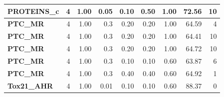 \begin{longtable}{|l||r|r|r|r|r|r||r|r|}
		\textbf{PROTEINS\_c} & 4 & 1.00 & 0.05 & 0.10 & 0.50 & 1.00 & 72.56 & 10 \\ \hline
		\textbf{PTC\_MR} & 4 & 1.00 & 0.3 & 0.20 & 0.20 & 1.00 & 64.59 & 4 \\ \hline
		\textbf{PTC\_MR} & 4 & 1.00 & 0.3 & 0.20 & 0.20 & 1.00 & 64.41 & 10 \\ \hline
		\textbf{PTC\_MR} & 4 & 1.00 & 0.3 & 0.20 & 0.20 & 1.00 & 64.72 & 10 \\ \hline
		\textbf{PTC\_MR} & 4 & 1.00 & 0.3 & 0.10 & 0.10 & 0.60 & 63.87 & 6 \\ \hline
		\textbf{PTC\_MR} & 4 & 1.00 & 0.3 & 0.40 & 0.40 & 0.60 & 64.92 & 1 \\ \hline
		\textbf{Tox21\_AHR} & 4 & 1.00 & 0.01 & 0.10 & 0.10 & 0.60 & 88.37 & 0 \\ \hline
	\end{longtable}		

